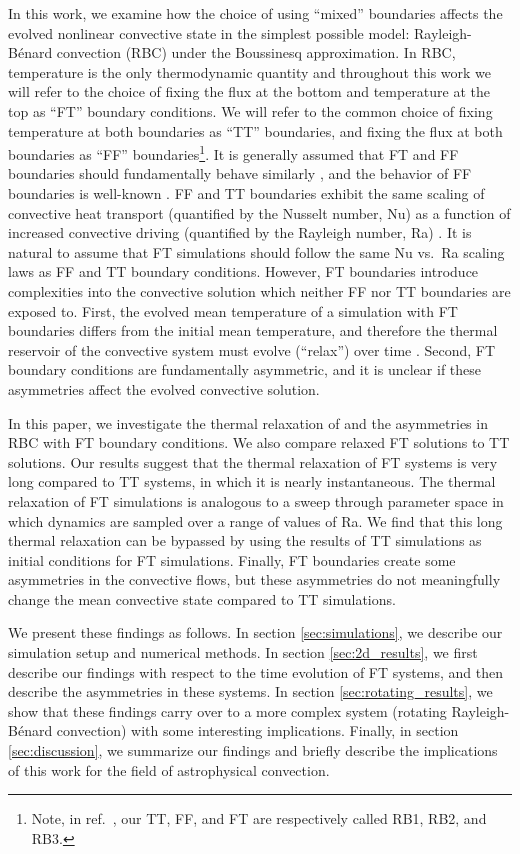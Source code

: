 \documentclass[aps, pre, onecolumn, nofootinbib, notitlepage, groupedaddress, amsfonts, amssymb, amsmath, longbibliography, superscriptaddress]{revtex4-1}
\newcommand{\RB}{Rayleigh-B\'{e}nard }
\begin{document}
In this work, we examine how the choice of using ``mixed'' boundaries affects the evolved nonlinear convective state in the simplest possible model: \RB convection (RBC) under the Boussinesq approximation.
In RBC, temperature is the only thermodynamic quantity and throughout this work we will refer to the choice of fixing the flux at the bottom and temperature at the top as ``FT'' boundary conditions.
We will refer to the common choice of fixing temperature at both boundaries as ``TT'' boundaries, and fixing the flux at both boundaries as ``FF'' boundaries\footnote{Note, in ref.~\cite{goluskin2016}, our TT, FF, and FT are respectively called RB1, RB2, and RB3.}.
It is generally assumed that FT and FF boundaries should fundamentally behave similarly \cite{goluskin2016}, and the behavior of FF boundaries is well-known \cite{otero&all2002, johnston&doering2009}.
FF and TT boundaries exhibit the same scaling of convective heat transport (quantified by the Nusselt number, Nu) as a function of increased convective driving (quantified by the Rayleigh number, Ra) \cite{johnston&doering2009}.
It is natural to assume that FT simulations should follow the same Nu vs.~Ra scaling laws as FF and TT boundary conditions.
However, FT boundaries introduce complexities into the convective solution which neither FF nor TT boundaries are exposed to.
First, the evolved mean temperature of a simulation with FT boundaries differs from the initial mean temperature, and therefore the thermal reservoir of the convective system must evolve (``relax'') over time \cite{anders&all2018}.
Second, FT boundary conditions are fundamentally asymmetric, and it is unclear if these asymmetries affect the evolved convective solution.

In this paper, we investigate the thermal relaxation of and the asymmetries in RBC with FT boundary conditions.
We also compare relaxed FT solutions to TT solutions.
Our results suggest that the thermal relaxation of FT systems is very long compared to TT systems, in which it is nearly instantaneous.
The thermal relaxation of FT simulations is analogous to a sweep through parameter space in which dynamics are sampled over a range of values of Ra.
We find that this long thermal relaxation can be bypassed by using the results of TT simulations as initial conditions for FT simulations.
Finally, FT boundaries create some asymmetries in the convective flows, but these asymmetries do not meaningfully change the mean convective state compared to TT simulations.

We present these findings as follows.
In section \ref{sec:simulations}, we describe our simulation setup and numerical methods.
In section \ref{sec:2d_results}, we first describe our findings with respect to the time evolution of FT systems, and then describe the asymmetries in these systems.
In section \ref{sec:rotating_results}, we show that these findings carry over to a more complex system (rotating \RB convection) with some interesting implications.
Finally, in section \ref{sec:discussion}, we summarize our findings and briefly describe the implications of this work for the field of astrophysical convection.
\end{document}
